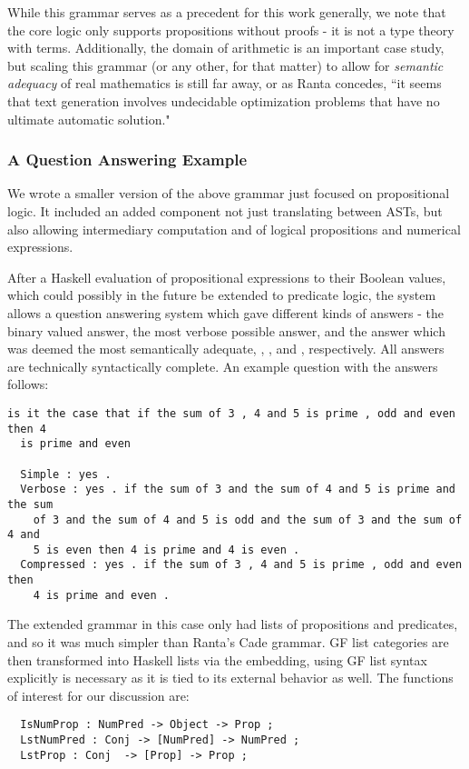 While this grammar serves as a precedent for this work generally, we note that
the core logic only supports propositions without proofs - it is not a type
theory with terms. Additionally, the domain of arithmetic is an important case
study, but scaling this grammar (or any other, for that matter) to allow for
\emph{semantic adequacy} of real mathematics is still far away, or as Ranta
concedes, ``it seems that text generation involves undecidable optimization
problems that have no ultimate automatic solution."

\subsubsection{A Question Answering Example}

We wrote a smaller version of the above grammar \cite{warrickQA} just focused on
propositional logic. It included an added component not just translating between
ASTs, but also allowing intermediary computation and of logical
propositions and numerical expressions.

After a Haskell evaluation of propositional expressions to their Boolean values,
which could possibly in the future be extended to predicate logic, the system
allows a question answering system which gave different kinds of answers - the
binary valued answer, the most verbose possible answer, and the answer which was
deemed the most semantically adequate, , ,
and , respectively. All answers are technically syntactically
complete. An example question with the answers follows:
\begin{verbatim}
is it the case that if the sum of 3 , 4 and 5 is prime , odd and even then 4
  is prime and even

  Simple : yes .
  Verbose : yes . if the sum of 3 and the sum of 4 and 5 is prime and the sum
    of 3 and the sum of 4 and 5 is odd and the sum of 3 and the sum of 4 and
    5 is even then 4 is prime and 4 is even .
  Compressed : yes . if the sum of 3 , 4 and 5 is prime , odd and even then
    4 is prime and even .
\end{verbatim}

The extended grammar in this case only had lists of propositions and predicates,
and so it was much simpler than Ranta's Cade grammar. GF list categories are
then transformed into Haskell lists via the embedding, using GF list syntax
explicitly is necessary as it is tied to its external behavior as well. The
functions of interest for our discussion are:
\begin{verbatim}
  IsNumProp : NumPred -> Object -> Prop ;
  LstNumPred : Conj -> [NumPred] -> NumPred ;
  LstProp : Conj  -> [Prop] -> Prop ;
\end{verbatim}

